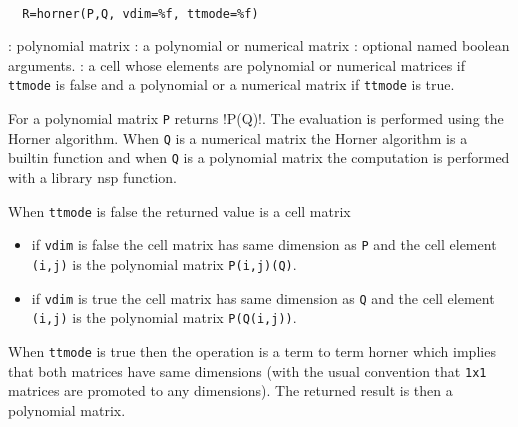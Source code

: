 \begin{mandesc}
   \\ %
\end{mandesc}
\begin{calling_sequence}
\begin{verbatim}
  R=horner(P,Q, vdim=%f, ttmode=%f)
\end{verbatim}
\end{calling_sequence}
\begin{parameters}
  \begin{varlist}
    : polynomial matrix
    : a polynomial or numerical matrix
    : optional named boolean arguments.
    : a cell whose elements are  polynomial or numerical matrices 
    if \verb!ttmode! is false and a  polynomial or a numerical matrix if 
    \verb!ttmode! is true.
  \end{varlist}
\end{parameters}
\begin{mandescription}
  For a polynomial matrix \verb!P! returns !P(Q)!. The evaluation 
  is performed using the Horner algorithm. When \verb!Q! is a 
  numerical matrix the Horner algorithm is a builtin function 
  and when \verb!Q! is a  polynomial matrix the computation is 
  performed with a library nsp function. 
  
  When \verb!ttmode! is false the returned value is a cell matrix 
  \begin{itemize}
    \item if \verb!vdim! is false the cell matrix has same dimension 
      as \verb!P! and the cell element \verb!(i,j)! is the polynomial
      matrix \verb!P(i,j)(Q)!. 
    \item if \verb!vdim! is true the cell matrix has same dimension 
      as \verb!Q! and the cell element \verb!(i,j)! is the polynomial
      matrix \verb!P(Q(i,j))!.
  \end{itemize}
  
  When \verb!ttmode! is true then the operation is a term to term 
  horner which implies that both matrices have same dimensions (with 
  the usual convention that \verb!1x1! matrices are promoted 
  to any dimensions).  The returned result is then a polynomial matrix. 
  
\end{mandescription}
